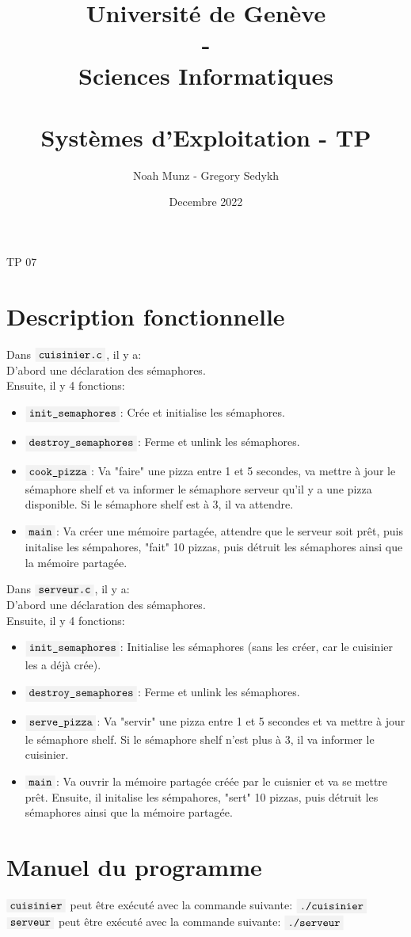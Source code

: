 \documentclass[french]{article}
\title{\vspace{-2.5cm}
   {\huge Université de Genève \\ - \\ Sciences Informatiques} \\
    \vspace{0.6cm}
    \unilogo{0.38} \\
    \vspace{1.1cm}
    {\huge Systèmes d'Exploitation - TP \nb}
    \vspace{0.1cm}
}
\author{Noah Munz - Gregory Sedykh}
\date{Decembre 2022}
\newcommand{\code}[1]{$\mbox{\colorbox{light-gray}{\texttt{#1}}}$}
\newcommand{\nb}{07}
\begin{document}
%
\maketitle
\vspace{0.3cm}
\thispagestyle{empty}
\clearpage
\setcounter{page}{1}
%
%
\begin{center}
{\huge TP \nb}
\end{center}
\vspace{0.3cm}

\section*{Description fonctionnelle}
Dans \code{cuisinier.c}, il y a:\\
D'abord une déclaration des sémaphores.\\
Ensuite, il y 4 fonctions:
\begin{itemize}
    \item \code{init\_semaphores}: Crée et initialise les sémaphores.
    \item \code{destroy\_semaphores}: Ferme et unlink les sémaphores.
    \item \code{cook\_pizza}: Va "faire" une pizza entre 1 et 5 secondes, va mettre à jour le sémaphore shelf et va informer le sémaphore serveur qu'il y a une pizza disponible. Si le sémaphore shelf est à 3, il va attendre.
    \item \code{main}: Va créer une mémoire partagée, attendre que le serveur soit prêt, puis initalise les sémpahores, "fait" 10 pizzas, puis détruit les sémaphores ainsi que la mémoire partagée.
\end{itemize}


Dans \code{serveur.c}, il y a:\\
D'abord une déclaration des sémaphores.\\
Ensuite, il y 4 fonctions:
\begin{itemize}
    \item \code{init\_semaphores}: Initialise les sémaphores (sans les créer, car le cuisinier les a déjà crée).
    \item \code{destroy\_semaphores}: Ferme et unlink les sémaphores.
    \item \code{serve\_pizza}: Va "servir" une pizza entre 1 et 5 secondes et va mettre à jour le sémaphore shelf. Si le sémaphore shelf n'est plus à 3, il va informer le cuisinier.
    \item \code{main}: Va ouvrir la mémoire partagée créée par le cuisnier et va se mettre prêt. Ensuite, il initalise les sémpahores, "sert" 10 pizzas, puis détruit les sémaphores ainsi que la mémoire partagée.
\end{itemize}


\section*{Manuel du programme}
\code{cuisinier} peut être exécuté avec la commande suivante: \code{./cuisinier}\\
\code{serveur} peut être exécuté avec la commande suivante: \code{./serveur}
\end{document}
